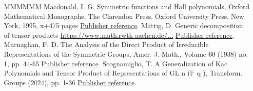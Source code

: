 \begin{thebibliography}{MMMMMM}
 Macdonald, I. G. Symmetric functions and Hall polynomials, Oxford Mathematical Monographs, The Clarendon Press, Oxford University Press, New York, 1995, x+475 pages \href{https://alco.centre-mersenne.org/articles/10.5802/alco.434/#macdonald}{Publisher reference}.
 Mattig, D. Generic decomposition of tensor products \url{https://www.math.rwth-aachen.de/...} \href{https://alco.centre-mersenne.org/articles/10.5802/alco.434/#Lu}{Publisher reference}.
 Murnaghan, F. D. The Analysis of the Direct Product of Irreducible Representations of the Symmetric Groups, Amer. J. Math., Volume 60 (1938) no. 1, pp. 44-65 \href{https://alco.centre-mersenne.org/articles/10.5802/alco.434/#Mu}{Publisher reference}.
 Scognamiglio, T. A Generalization of Kac Polynomials and Tensor Product of Representations of GL n (𝔽 q ), Transform. Groups (2024), pp. 1-36 \href{https://alco.centre-mersenne.org/articles/10.5802/alco.434/#S}{Publisher reference}.
\end{thebibliography}
